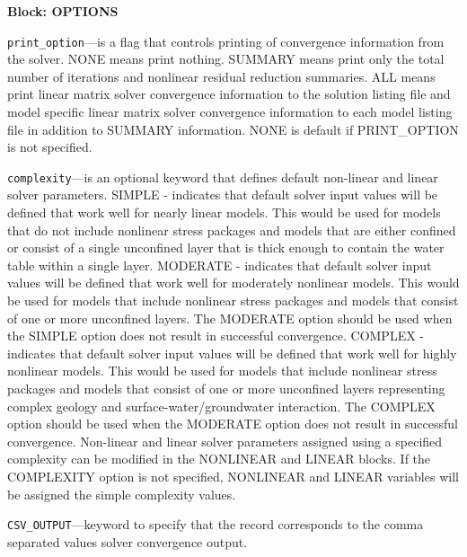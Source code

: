 
\item \textbf{Block: OPTIONS}

\begin{description}
\item \texttt{print\_option}---is a flag that controls printing of convergence information from the solver.  NONE means print nothing. SUMMARY means print only the total number of iterations and nonlinear residual reduction summaries. ALL means print linear matrix solver convergence information to the solution listing file and model specific linear matrix solver convergence information to each model listing file in addition to SUMMARY information. NONE is default if PRINT\_OPTION is not specified.

\item \texttt{complexity}---is an optional keyword that defines default non-linear and linear solver parameters.  SIMPLE - indicates that default solver input values will be defined that work well for nearly linear models. This would be used for models that do not include nonlinear stress packages and models that are either confined or consist of a single unconfined layer that is thick enough to contain the water table within a single layer. MODERATE - indicates that default solver input values will be defined that work well for moderately nonlinear models. This would be used for models that include nonlinear stress packages and models that consist of one or more unconfined layers. The MODERATE option should be used when the SIMPLE option does not result in successful convergence.  COMPLEX - indicates that default solver input values will be defined that work well for highly nonlinear models. This would be used for models that include nonlinear stress packages and models that consist of one or more unconfined layers representing complex geology and surface-water/groundwater interaction. The COMPLEX option should be used when the MODERATE option does not result in successful convergence.  Non-linear and linear solver parameters assigned using a specified complexity can be modified in the NONLINEAR and LINEAR blocks. If the COMPLEXITY option is not specified, NONLINEAR and LINEAR variables will be assigned the simple complexity values.

\item \texttt{CSV\_OUTPUT}---keyword to specify that the record corresponds to the comma separated values solver convergence output.


\end{description}
